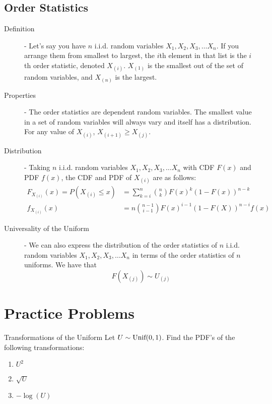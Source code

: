 \documentclass[11.5pt]{article}
\begin{document}
\begin{notes}
\section*{Order Statistics}
\begin{description}
	\item[Definition] - Let's say you have $n$ i.i.d. random variables $X_1, X_2, X_3, \dots X_n$. If you arrange them from smallest to largest, the $i$th element in that list is the $i$th order statistic, denoted $X_{(i)}$. $X_{(1)}$ is the smallest out of the set of random variables, and $X_{(n)}$ is the largest.
	\item[Properties] - The order statistics are dependent random variables. The smallest value in a set of random variables will always vary and itself has a distribution. For any value of $X_{(i)}$, $X_{(i+1)} \geq X_{(j)}$.
	\item[Distribution] - Taking $n$ i.i.d. random variables $X_1, X_2, X_3, \dots X_n$ with CDF $F(x)$ and PDF $f(x)$, the CDF and PDF of $X_{(i)}$ are as follows:
	\begin{align*}
		F_{X_{(i)}}(x) = P (X_{(i)} \leq x) &= \sum_{k=i}^n {n \choose k} F(x)^k(1 - F(x))^{n - k} \\
		f_{X_{(i)}}(x) &= n{n - 1 \choose i - 1}F(x)^{i-1}(1 - F(X))^{n-i}f(x)
	\end{align*}
	\item[Universality of the Uniform] - We can also express the distribution of the order statistics of $n$  i.i.d. random variables $X_1, X_2, X_3, \dots X_n$ in terms of the order statistics of $n$ uniforms. We have that
	\[F(X_{(j)}) \sim U_{(j)}\]
\end{description}


\end{notes}

\newpage

\section*{Practice Problems} 


\begin{exercise}{Transformations of the Uniform}
Let $U \sim \textrm{Unif}(0,1)$. Find the PDF's of the following transformations: 
\begin{enumerate}
\item $U^2$ 
\item $\sqrt{U}$ 
\item $- \log(U)$
\end{enumerate}
\end{exercise}
\end{document}
